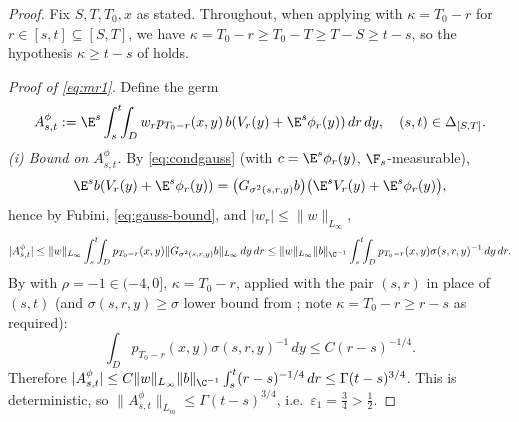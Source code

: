 \begin{proof}
Fix $S,T,T_0,x$ as stated. Throughout, when applying  with $\kappa=T_0-r$ for $r\in[s,t]\subseteq[S,T]$, we have $\kappa=T_0-r\ge T_0-T\ge T-S\ge t-s$, so the hypothesis $\kappa\ge t-s$ of  holds.

\smallskip
\emph{Proof of \eqref{eq:mr1}.} Define the germ
\[
A^\phi_{s,t}:=\E^s\int_s^t\!\!\int_D w_r p_{T_0-r}(x,y)\,b(V_r(y)+\E^s\phi_r(y))\,dr\,dy,\quad (s,t)\in\Delta_{[S,T]}.
\]
\emph{(i) Bound on $A^\phi_{s,t}$.} By \eqref{eq:condgauss} (with $c=\E^s\phi_r(y)$, $\F_s$-measurable),
\[
\E^s b(V_r(y)+\E^s\phi_r(y))=\big(G_{\sigma^2(s,r,y)}b\big)\big(\E^s V_r(y)+\E^s\phi_r(y)\big),
\]
hence by Fubini, \eqref{eq:gauss-bound}, and $|w_r|\le\|w\|_{L_\infty}$,
\[
|A^\phi_{s,t}|\le \|w\|_{L_\infty}\int_s^t\!\!\int_D p_{T_0-r}(x,y)\|G_{\sigma^2(s,r,y)}b\|_{L_\infty}\,dy\,dr
\le \|w\|_{L_\infty}\|b\|_{\C^{-1}}\int_s^t\!\!\int_D p_{T_0-r}(x,y)\sigma(s,r,y)^{-1}\,dy\,dr.
\]
By  with $\rho=-1\in(-4,0]$, $\kappa=T_0-r$, applied with the pair $(s,r)$ in place of $(s,t)$ (and $\sigma(s,r,y)\ge\sigma$ lower bound from ; note $\kappa=T_0-r\ge r-s$ as required):
\[
\int_D p_{T_0-r}(x,y)\sigma(s,r,y)^{-1}\,dy\le C(r-s)^{-1/4}.
\]
Therefore $|A^\phi_{s,t}|\le C\|w\|_{L_\infty}\|b\|_{\C^{-1}}\int_s^t(r-s)^{-1/4}\,dr\le \Gamma(t-s)^{3/4}$. This is deterministic, so $\|A^\phi_{s,t}\|_{L_m}\le\Gamma(t-s)^{3/4}$, i.e.\ $\varepsilon_1=\tfrac34>\tfrac12$.


\end{proof}
